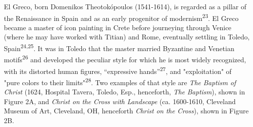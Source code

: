 \documentclass[11pt]{article}
\begin{document}
El Greco, born Domenikos Theotokópoulos (1541-1614), is regarded as a
pillar of the Renaissance in Spain and as an early progenitor of
modernism\textsuperscript{23}. El Greco became a master of icon painting
in Crete before journeying through Venice (where he may have worked with
Titian) and Rome, eventually settling in Toledo,
Spain\textsuperscript{24,25}. It was in Toledo that the master married
Byzantine and Venetian motifs\textsuperscript{26} and developed the
peculiar style for which he is most widely recognized, with its
distorted human figures, ``expressive hands''\textsuperscript{27}, and
"exploitation" of "pure colors to their limits"\textsuperscript{28}. Two
examples of that style are \emph{The Baptism of Christ} (1624, Hospital
Tavera, Toledo, Esp., henceforth, \emph{The Baptism}), shown in Figure
2A, and \emph{Christ on the Cross with Landscape} (ca. 1600-1610,
Cleveland Museum of Art, Cleveland, OH, henceforth \emph{Christ on the
Cross}), shown in Figure 2B.
\end{document}
